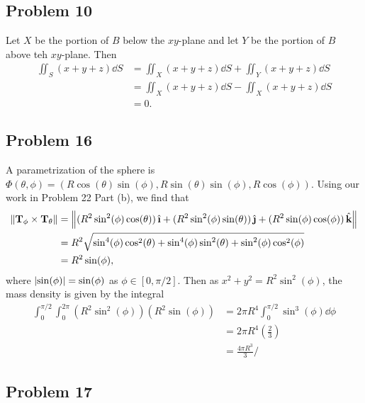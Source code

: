 \documentclass[11pt]{article}
\newcommand{\uvec}[1]{\mathop{} \!\hat{\textbf{#1}}}
\begin{document}
\subsection*{Problem 10}

Let $X$ be the portion of $B$ below the $xy$-plane and let $Y$ be the portion of $B$ above teh $xy$-plane. Then
\begin{align*}
	\iint_{S}(x + y + z) \dd{S} &= \iint_{X} (x + y + z) \dd{S} + \iint_{Y} (x + y + z) \dd{S} \\
	&= \iint_{X} (x + y + z) \dd{S} - \iint_{X} (x + y + z) \dd{S} \\
	&= 0.
\end{align*}


\subsection*{Problem 16}

A parametrization of the sphere is $\Phi(\theta, \phi) = (R\cos(\theta)\sin(\phi), R \sin(\theta)\sin(\phi), R \cos(\phi))$. Using our work in Problem 22 Part (b), we find that
\begin{align*}
	\norm{\mathbf{T}_{\phi} \times \mathbf{T}_{\theta}} &= \norm{(R^{2} \sin^{2}(\phi) \cos(\theta)) \uvec{\i} + (R^{2} \sin^{2}(\phi)\sin(\theta)) \uvec{\j} + (R^{2} \sin(\phi) \cos(\phi)) \uvec{k}} \\
	&= R^{2} \sqrt{\sin^{4}(\phi)\cos^{2}(\theta) + \sin^{4}(\phi)\sin^{2}(\theta) + \sin^{2}(\phi) \cos^{2}(\phi)} \\
	&= R^{2} \sin(\phi),
\end{align*}
where $\abs{\sin(\phi)} = \sin(\phi)$ as $\phi \in [0, \pi/2]$. Then as $x^{2} + y^{2} = R^{2}\sin^{2}(\phi)$, the mass density is given by the integral
\begin{align*}
	\int_{0}^{\pi/2} \int_{0}^{2\pi} (R^{2}\sin^{2}(\phi))(R^{2} \sin(\phi)) &= 2\pi R^{4} \int_{0}^{\pi/2} \sin^{3}(\phi) \dd{\phi} \\
	&= 2\pi R^{4} \left( \frac{2}{3} \right) \\
	&= \boxed{\frac{4\pi R^{3}}{3}}/
\end{align*}


\subsection*{Problem 17}
\end{document}

